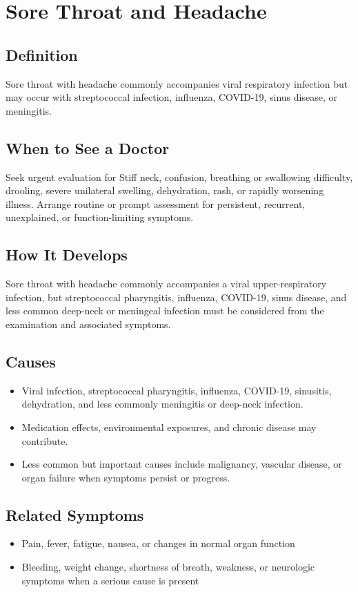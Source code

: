 \chapter{Sore Throat and Headache}

\section*{Definition}
Sore throat with headache commonly accompanies viral respiratory infection but may occur with streptococcal infection, influenza, COVID-19, sinus disease, or meningitis.

\section*{When to See a Doctor}
Seek urgent evaluation for Stiff neck, confusion, breathing or swallowing difficulty, drooling, severe unilateral swelling, dehydration, rash, or rapidly worsening illness. Arrange routine or prompt assessment for persistent, recurrent, unexplained, or function-limiting symptoms.

\section*{How It Develops}
Sore throat with headache commonly accompanies a viral upper-respiratory infection, but streptococcal pharyngitis, influenza, COVID-19, sinus disease, and less common deep-neck or meningeal infection must be considered from the examination and associated symptoms.

\section*{Causes}
\begin{itemize}
  \item Viral infection, streptococcal pharyngitis, influenza, COVID-19, sinusitis, dehydration, and less commonly meningitis or deep-neck infection.
  \item Medication effects, environmental exposures, and chronic disease may contribute.
  \item Less common but important causes include malignancy, vascular disease, or organ failure when symptoms persist or progress.
\end{itemize}

\section*{Related Symptoms}
\begin{itemize}
  \item Pain, fever, fatigue, nausea, or changes in normal organ function
  \item Bleeding, weight change, shortness of breath, weakness, or neurologic symptoms when a serious cause is present
\end{itemize}

